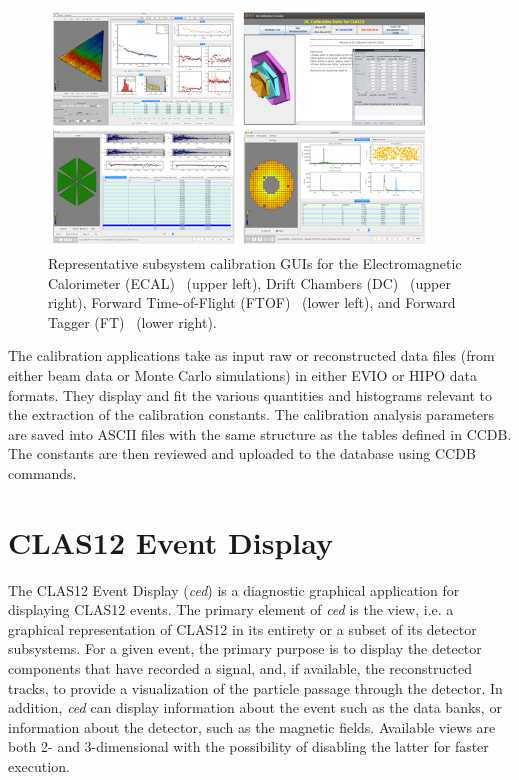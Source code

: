 \begin{figure}
\centering
\includegraphics[width=0.9\textwidth]{pics/suites.png}
\caption{Representative subsystem calibration GUIs for the Electromagnetic Calorimeter (ECAL)~\cite{ecal-nim}
  (upper left), Drift Chambers (DC)~\cite{dc-nim} (upper right), Forward Time-of-Flight (FTOF)~\cite{ftof-nim}
  (lower left),  and Forward Tagger (FT)~\cite{ft-nim} (lower right).}
\label{suites}
\end{figure}

The calibration applications take as input raw or reconstructed data files (from either beam data or Monte Carlo
simulations) in either EVIO or HIPO data formats.  They display and fit the various quantities and histograms
relevant to the extraction of the calibration constants.  The calibration analysis parameters are saved into ASCII
files with the same structure as the tables defined in CCDB.  The constants are then reviewed and uploaded to the database using CCDB commands.

\section{CLAS12 Event Display}
\label{sec:ced}

The CLAS12 Event Display ({\it ced}) is a diagnostic graphical application for displaying CLAS12 events. The
primary element of {\it ced} is the view, i.e. a graphical representation of CLAS12 in its entirety or a subset of
its detector subsystems. For a given event, the primary purpose is to display the detector components that have
recorded a signal, and, if available, the reconstructed tracks, to provide a visualization of the particle passage
through the detector. In addition, {\it ced} can display information about the event such as the data banks, or
information about the detector, such as the magnetic fields. Available views are both 2- and 3-dimensional with
the possibility of disabling the latter for faster execution.

